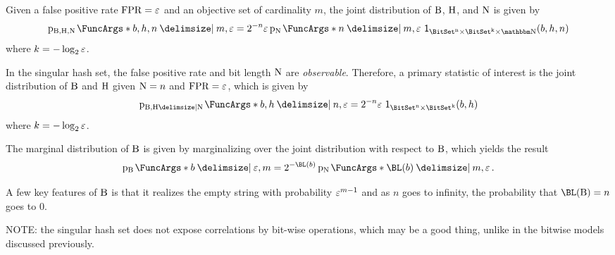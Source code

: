 \documentclass[ ../main.tex]{subfiles}
\begin{document}
Given a false positive rate $\mathrm{FPR} = \varepsilon$ and an objective set of cardinality $m$, the joint distribution of $\mathrm{B}$, $\mathrm{H}$, and $\mathrm{N}$ is given by
\begin{equation}
    \PDF{b,h,n \Given m,\fprate}[\RV{B},\RV{H},\RV{N}] = 2^{-n} \fprate \PDF{n \Given m,\fprate}[\RV{N}]\, \SetIndicator{\BitSet^n \times \BitSet^k \times \NatSet}(b,h,n)
\end{equation}
where $k = -\log_2 \varepsilon$.

In the singular hash set, the false positive rate and bit length $\mathrm{N}$ are \emph{observable}.
Therefore, a primary statistic of interest is the joint distribution of $\mathrm{B}$ and $\mathrm{H}$ given $\mathrm{N} = n$ and $\mathrm{FPR} = \varepsilon$, which is given by
\begin{equation}
    \PDF{b,h \Given n,\fprate}[\RV{B},\RV{H} \Given \RV{N}] = 2^{-n} \fprate \, \SetIndicator{\BitSet^n \times \BitSet^k}(b,h)
\end{equation}
where $k = -\log_2 \varepsilon$.



%


The marginal distribution of $\mathrm{B}$ is given by marginalizing over the joint distribution with respect to $\mathrm{B}$, which yields the result
\begin{equation}
    \PDF{b \Given \fprate, m}[\RV{B}] = 2^{-\BL(b)} \PDF{\BL(b) \Given m, \fprate}[\RV{N}]\,.
\end{equation}



A few key features of $\mathrm{B}$ is that it realizes the empty string with probability $\varepsilon^{m-1}$ and as $n$ goes to infinity, the probability that $\BL(\RV{B})=n$ goes to $0$.



NOTE: the singular hash set does not expose correlations by bit-wise operations, which may be a good thing, unlike in the bitwise models discussed previously.


\end{document}
